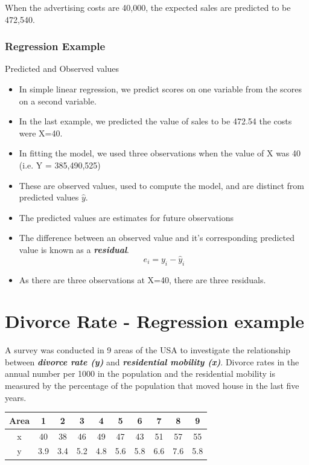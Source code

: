 \documentclass[]{report}
\begin{document}
When the advertising costs are 40,000, the expected sales are predicted to be 472,540.


\subsubsection{Regression Example}

Predicted and Observed values
\begin{itemize}
	\item In simple linear regression, we predict scores on one variable from the scores on a second variable.
	\item In the last example, we predicted the value of sales to be 472.54 the costs were X=40.
	\item In fitting the model, we used three observations when the value of X was 40 (i.e. Y = 385,490,525)
	\item These are observed values, used to compute the model, and are distinct from predicted values $\hat{y}$.
	\item The predicted values are estimates for future observations
	\item The difference between an observed value and it's corresponding predicted value is known as a \textbf{\textit{residual}}.
	\[e_i = y_i-\hat{y}_i \]
	\item As there are three observations at X=40, there are three residuals.
\end{itemize}



		\section{Divorce Rate - Regression example}
	
	A survey was conducted in 9 areas of the USA to investigate the relationship between
	\textbf{\textit{divorce rate (y)}} and \textbf{\textit{residential mobility (x)}}. Divorce rates in the annual number per 1000 in the population
	and the residential mobility is measured by the percentage of the population that moved house in the last
	five years.
	
	\begin{center}
		\begin{tabular}{|c|c|c|c|c|c|c|c|c|c|}
			\hline
			Area & 1 & 2 & 3 & 4 & 5 & 6 & 7 & 8 & 9  \\ \hline 
			x & 40 & 38 & 46 & 49 & 47 & 43 & 51 & 57 & 55\\ \hline
			y & 3.9 & 3.4 & 5.2 & 4.8 & 5.6 & 5.8 & 6.6 & 7.6 & 5.8\\
			\hline
		\end{tabular}
	\end{center}
	
\end{document}
